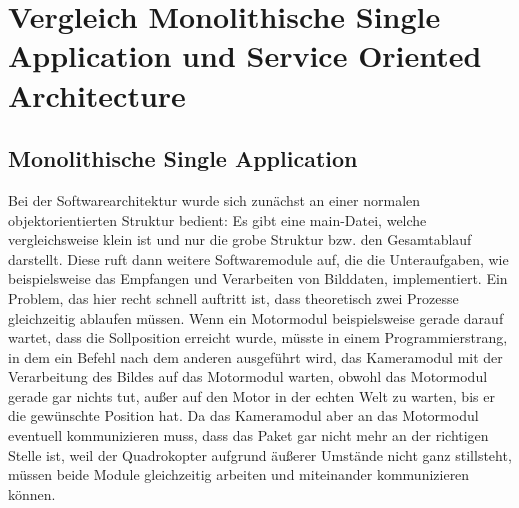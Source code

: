 \section{Vergleich Monolithische Single Application und Service Oriented Architecture}
\subsection{Monolithische Single Application}
Bei der Softwarearchitektur wurde sich zunächst an einer normalen objektorientierten Struktur bedient: Es gibt eine main-Datei, welche vergleichsweise
klein ist und nur die grobe Struktur bzw. den Gesamtablauf darstellt. Diese ruft dann weitere Softwaremodule auf, die die Unteraufgaben, wie beispielsweise das Empfangen und Verarbeiten von Bilddaten, implementiert. Ein Problem, das hier recht schnell auftritt ist, dass theoretisch zwei Prozesse gleichzeitig ablaufen müssen. Wenn ein Motormodul beispielsweise gerade darauf wartet, dass die Sollposition erreicht wurde, müsste in einem Programmierstrang, in dem ein Befehl nach dem anderen ausgeführt wird, das Kameramodul mit der Verarbeitung des Bildes auf das Motormodul warten, obwohl das Motormodul gerade gar nichts tut, außer auf den
Motor in der echten Welt zu warten, bis er die gewünschte Position hat. Da das Kameramodul aber an das Motormodul eventuell kommunizieren muss, dass das
Paket gar nicht mehr an der richtigen Stelle ist, weil der Quadrokopter aufgrund äußerer Umstände nicht ganz stillsteht, müssen beide Module gleichzeitig arbeiten und
miteinander kommunizieren können. \\

